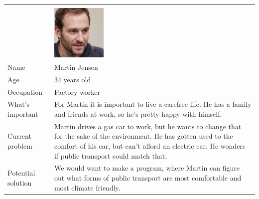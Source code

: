 \begin{tabularx}{\textwidth}{ | l X | }
    \hline
    &                                                       \\
    & \includegraphics[width=0.25\textwidth]{images/martin} \\
    Name       & Martin Jensen                                         \\
    Age        & 34 years old                                          \\
    Occupation & Factory worker                                        \\
    What's important & For Martin it is important to live a carefree life.
    He has a family and friends at work, so he's pretty happy with himself. \\
    Current problem & Martin drives a gas car to work, but he wants to change that for the sake of the environment.
    He has gotten used to the comfort of his car, but can't afford an electric car.
    He wonders if public transport could match that. \\
    Potential solution & We would want to make a program, where Martin can figure out what forms of public transport are
    most comfortable and most climate friendly. \\
    \hline
\end{tabularx}
